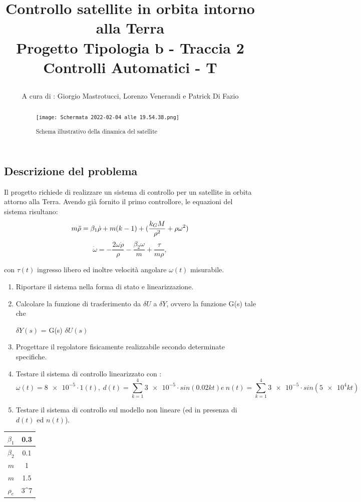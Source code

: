 \documentclass{article}
\title{
Controllo satellite in orbita intorno alla Terra\\
  \large Progetto Tipologia b - Traccia 2 \\
Controlli Automatici - T

}
\author{A cura di : Giorgio Mastrotucci, Lorenzo Venerandi e Patrick Di Fazio}
\date{}
\begin{document}
\maketitle

\begin{abstract}
\begin{figure}[h!]
\centering
\texttt{[image: Schermata 2022-02-04 alle 19.54.38.png]}
\caption{\label{fig:orbit}Schema illustrativo della dinamica del satellite}
\end{figure}
\end{abstract}

\begin{center}
\section*{Descrizione del problema}
\end{center}
Il progetto richiede di realizzare un sistema di controllo per un satellite in orbita attorno alla Terra.
Avendo già fornito il primo controllore, le equazioni del sistema risultano:
\[m \Ddot{\rho} = \beta_1\Dot{\rho} + m(k-1)+  (\frac{k_G M}{\rho^{2}} + \rho \omega^{2}) \]
\[\Dot{\omega} = -\frac{2\omega \Dot{\rho} }{\rho} -
\frac{\beta_2 \omega }{m}+ \frac{\tau}{m \rho} ,\]

con $\tau(t)$ ingresso libero ed inoltre velocità angolare $\omega(t)$ misurabile.


\begin{enumerate}
\item Riportare il sistema nella forma di stato e linearizzazione.
\item Calcolare la funzione di trasferimento da $\delta U$  a  $\delta Y$,  ovvero la funzione G(s) tale che  \begin{center} $\delta Y (s)$ = G(s) $\delta U (s)$ \end{center}
\item Progettare il regolatore fisicamente realizzabile secondo determinate specifiche.
\item Testare il sistema di controllo linearizzato con :
\[	\omega(t)=\num{8e-5} \cdot 1(t) , \ d(t)= \sum_{k=1}^4 \num{3e-5}\cdot sin(0.02kt) e \  n(t)= \sum_{k=1}^4 \num{3e-5}\cdot sin(\num{5e4}kt)\]
\item Testare il sistema di controllo sul modello non lineare (ed in presenza di $d(t)$ ed $n(t)$).
\end{enumerate}


\begin{center}
\begin{tabular}{||c | c ||} 

 \hline\hline
 $\beta_1$ & 0.3 \\ 
 \hline
 $\beta_2$& 0.1  \\
 \hline
 $m$ & 1 \\
 \hline
 $m$  & 1.5  \\
 \hline
 $\rho_e$  & 3\cdot 10^{7} \\ [2ex] 
 \hline
\end{tabular}
\end{center}
\end{document}
